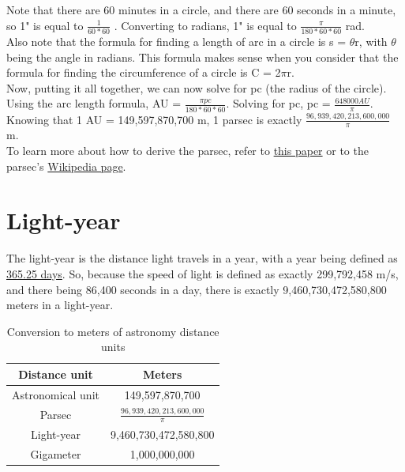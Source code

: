 \documentclass{article}
\begin{document}
\noindent Note that there are 60 minutes in a circle, and there are 60 seconds in a minute, so 1"
is equal to \(\frac{1}{60 * 60}\) \textdegree. Converting to radians, 1" is equal to
\(\frac{\pi}{180 * 60 * 60}\) rad. \\

\noindent Also note that the formula for finding a length of arc in a circle is s = $\theta$r, with
$\theta$ being the angle in radians. This formula makes sense when you consider that the formula
for finding the circumference of a circle is C = 2$\pi$r. \\

\noindent Now, putting it all together, we can now solve for pc (the radius of the circle). Using
the arc length formula, AU = \(\frac{\pi pc}{180 * 60 * 60}\). Solving for pc, pc =
\(\frac{648000 AU}{\pi}\). Knowing that 1 AU = 149,597,870,700 m, 1 parsec is exactly
\(\frac{96,939,420,213,600,000}{\pi}\) m. \\

\noindent To learn more about how to derive the parsec, refer to
\href{https://www.nature.com/articles/s41567-019-0685-3}{this paper} or to the parsec's
\href{https://en.wikipedia.org/wiki/Parsec}{Wikipedia page}.

\section*{Light-year}
The light-year is the distance light travels in a year, with a year being defined as
\href{https://web.archive.org/web/20070216041250/http://www.iau.org/Units.234.0.html}{365.25 days}.
So, because the speed of light is defined as exactly 299,792,458 m/s, and there being 86,400 seconds
in a day, there is exactly 9,460,730,472,580,800 meters in a light-year.


\begin{table}[h!]
\centering
    \begin{tabular}{||c c||}
        \hline
        Distance unit & Meters \\ [0.5ex] 
        \hline\hline
        Astronomical unit & 149,597,870,700 \\
        \hline
        Parsec & \(\frac{96,939,420,213,600,000}{\pi}\) \\
        \hline
        Light-year & 9,460,730,472,580,800  \\
        \hline
        Gigameter & 1,000,000,000 \\ [1ex] 
        \hline
    \end{tabular}
\caption{Conversion to meters of astronomy distance units}
\label{table:data}

\end{table}
\end{document}
